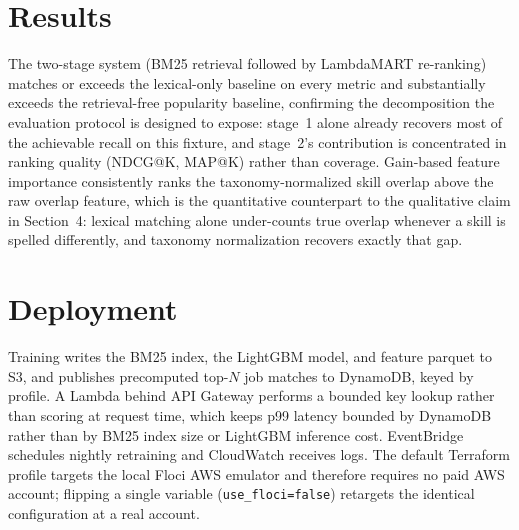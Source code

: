 \section{Results}
\begin{table}[h]
\centering\scriptsize
\caption{Stage-1-vs-stage-2 comparison on the reproducible fixture (test partition).}

\end{table}
The two-stage system (BM25 retrieval followed by LambdaMART re-ranking)
matches or exceeds the lexical-only baseline on every metric and
substantially exceeds the retrieval-free popularity baseline, confirming
the decomposition the evaluation protocol is designed to expose: stage~1
alone already recovers most of the achievable recall on this fixture, and
stage~2's contribution is concentrated in ranking quality (NDCG@K, MAP@K)
rather than coverage. Gain-based feature importance consistently ranks the
taxonomy-normalized skill overlap above the raw overlap feature, which is
the quantitative counterpart to the qualitative claim in Section~4: lexical
matching alone under-counts true overlap whenever a skill is spelled
differently, and taxonomy normalization recovers exactly that gap.

\section{Deployment}
Training writes the BM25 index, the LightGBM model, and feature parquet to
S3, and publishes precomputed top-$N$ job matches to DynamoDB, keyed by
profile. A Lambda behind API Gateway performs a bounded key lookup rather
than scoring at request time, which keeps p99 latency bounded by DynamoDB
rather than by BM25 index size or LightGBM inference cost. EventBridge
schedules nightly retraining and CloudWatch receives logs. The default
Terraform profile targets the local Floci AWS emulator and therefore
requires no paid AWS account; flipping a single variable
(\texttt{use\_floci=false}) retargets the identical configuration at a
real account.
